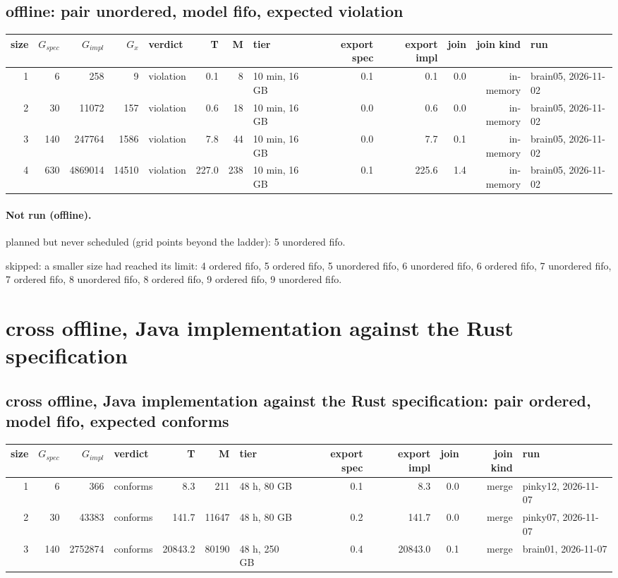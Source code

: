 \documentclass[10pt]{article}
\begin{document}
\subsection*{offline: pair \textsf{unordered}, model fifo, expected violation}
\begin{longtable}{@{}rrrrlrrlrrrrl@{}}
\toprule
size & $G_{\mathit{spec}}$ & $G_{\mathit{impl}}$ & $G_x$ & verdict & T & M & tier & export spec & export impl & join & join kind & run \\
\midrule
\endhead
\color{red} 1 & 6 & 258 & 9 & violation & 0.1 & 8 & 10 min, 16 GB & 0.1 & 0.1 & 0.0 & in-memory & brain05, 2026-11-02 \\
\color{red} 2 & 30 & 11072 & 157 & violation & 0.6 & 18 & 10 min, 16 GB & 0.0 & 0.6 & 0.0 & in-memory & brain05, 2026-11-02 \\
\color{red} 3 & 140 & 247764 & 1586 & violation & 7.8 & 44 & 10 min, 16 GB & 0.0 & 7.7 & 0.1 & in-memory & brain05, 2026-11-02 \\
\color{red} 4 & 630 & 4869014 & 14510 & violation & 227.0 & 238 & 10 min, 16 GB & 0.1 & 225.6 & 1.4 & in-memory & brain05, 2026-11-02 \\
\bottomrule
\end{longtable}
\paragraph{Not run (offline).}
planned but never scheduled (grid points beyond the ladder): 5 unordered fifo.\par
skipped: a smaller size had reached its limit: 4 ordered fifo, 5 ordered fifo, 5 unordered fifo, 6 unordered fifo, 6 ordered fifo, 7 unordered fifo, 7 ordered fifo, 8 unordered fifo, 8 ordered fifo, 9 ordered fifo, 9 unordered fifo.\par
\section*{cross offline, Java implementation against the Rust specification}
\subsection*{cross offline, Java implementation against the Rust specification: pair \textsf{ordered}, model fifo, expected conforms}
\begin{longtable}{@{}rrrlrrlrrrrl@{}}
\toprule
size & $G_{\mathit{spec}}$ & $G_{\mathit{impl}}$ & verdict & T & M & tier & export spec & export impl & join & join kind & run \\
\midrule
\endhead
\color{red} 1 & 6 & 366 & conforms & 8.3 & 211 & 48 h, 80 GB & 0.1 & 8.3 & 0.0 & merge & pinky12, 2026-11-07 \\
\color{red} 2 & 30 & 43383 & conforms & 141.7 & 11647 & 48 h, 80 GB & 0.2 & 141.7 & 0.0 & merge & pinky07, 2026-11-07 \\
\color{blue} 3 & 140 & 2752874 & conforms & 20843.2 & 80190 & 48 h, 250 GB & 0.4 & 20843.0 & 0.1 & merge & brain01, 2026-11-07 \\
\bottomrule
\end{longtable}
\end{document}
